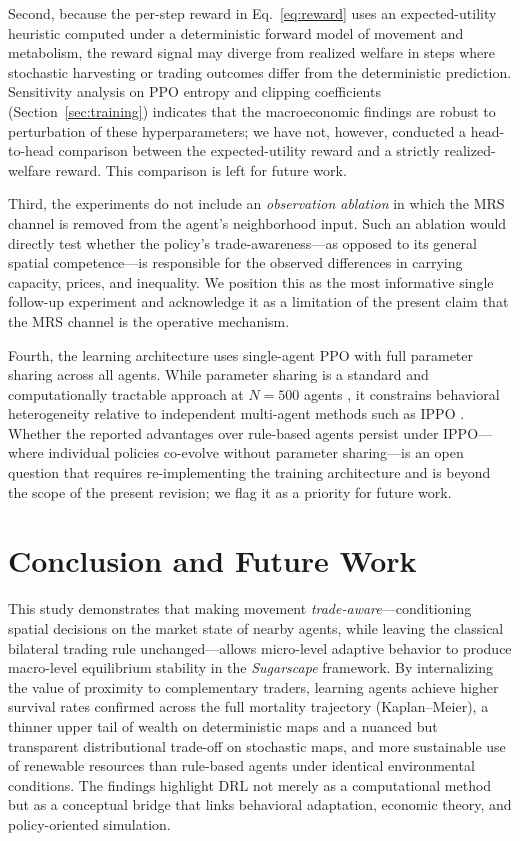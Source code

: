\documentclass[pdflatex,sn-mathphys-num]{sn-jnl}%
\theoremstyle{thmstyleone}%
\theoremstyle{thmstyletwo}%
\theoremstyle{thmstylethree}%
\begin{document}
Second, because the per-step reward in Eq.~\eqref{eq:reward} uses an expected-utility heuristic computed under a deterministic forward model of movement and metabolism, the reward signal may diverge from realized welfare in steps where stochastic harvesting or trading outcomes differ from the deterministic prediction.  
Sensitivity analysis on PPO entropy and clipping coefficients (Section~\ref{sec:training}) indicates that the macroeconomic findings are robust to perturbation of these hyperparameters; we have not, however, conducted a head-to-head comparison between the expected-utility reward and a strictly realized-welfare reward.  
This comparison is left for future work.

Third, the experiments do not include an \emph{observation ablation} in which the MRS channel is removed from the agent's neighborhood input.
Such an ablation would directly test whether the policy's trade-awareness---as opposed to its general spatial competence---is responsible for the observed differences in carrying capacity, prices, and inequality.
We position this as the most informative single follow-up experiment and acknowledge it as a limitation of the present claim that the MRS channel is the operative mechanism.

Fourth, the learning architecture uses single-agent PPO with full parameter sharing across all agents.
While parameter sharing is a standard and computationally tractable approach at $N = 500$ agents \citep{Yu2022}, it constrains behavioral heterogeneity relative to independent multi-agent methods such as IPPO \citep{deWitt2020}.
Whether the reported advantages over rule-based agents persist under IPPO---where individual policies co-evolve without parameter sharing---is an open question that requires re-implementing the training architecture and is beyond the scope of the present revision; we flag it as a priority for future work.

\section{Conclusion and Future Work}

This study demonstrates that making movement \emph{trade-aware}---conditioning spatial decisions on the market state of nearby agents, while leaving the classical bilateral trading rule unchanged---allows micro-level adaptive behavior to produce macro-level equilibrium stability in the \textit{Sugarscape} framework.  
By internalizing the value of proximity to complementary traders, learning agents achieve higher survival rates confirmed across the full mortality trajectory (Kaplan--Meier), a thinner upper tail of wealth on deterministic maps and a nuanced but transparent distributional trade-off on stochastic maps, and more sustainable use of renewable resources than rule-based agents under identical environmental conditions.  
The findings highlight DRL not merely as a computational method but as a conceptual bridge that links behavioral adaptation, economic theory, and policy-oriented simulation.
\end{document}
